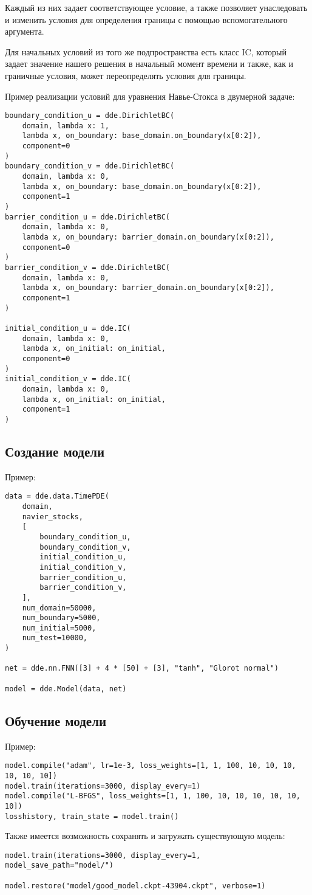 Каждый из них задает соответствующее условие, а также позволяет унаследовать и изменить условия
для определения границы с помощью вспомогательного аргумента.

Для начальных условий из того же подпространства есть класс IC, который задает значение нашего решения в начальный
момент времени и также, как и граничные условия, может переопределять условия для границы.

Пример реализации условий для уравнения Навье-Стокса в двумерной задаче:
\begin{verbatim}
boundary_condition_u = dde.DirichletBC(
    domain, lambda x: 1, 
    lambda x, on_boundary: base_domain.on_boundary(x[0:2]),
    component=0
)
boundary_condition_v = dde.DirichletBC(
    domain, lambda x: 0, 
    lambda x, on_boundary: base_domain.on_boundary(x[0:2]),
    component=1
)
barrier_condition_u = dde.DirichletBC(
    domain, lambda x: 0, 
    lambda x, on_boundary: barrier_domain.on_boundary(x[0:2]),
    component=0
)
barrier_condition_v = dde.DirichletBC(
    domain, lambda x: 0, 
    lambda x, on_boundary: barrier_domain.on_boundary(x[0:2]),
    component=1
)

initial_condition_u = dde.IC(
    domain, lambda x: 0,
    lambda x, on_initial: on_initial,
    component=0
)
initial_condition_v = dde.IC(
    domain, lambda x: 0,
    lambda x, on_initial: on_initial, 
    component=1
)
\end{verbatim}
    
\subsection{Создание модели}
Пример:
\begin{verbatim}
data = dde.data.TimePDE(
    domain,
    navier_stocks,
    [
        boundary_condition_u,
        boundary_condition_v,
        initial_condition_u,
        initial_condition_v,
        barrier_condition_u,
        barrier_condition_v,
    ],
    num_domain=50000,
    num_boundary=5000,
    num_initial=5000,
    num_test=10000,
)

net = dde.nn.FNN([3] + 4 * [50] + [3], "tanh", "Glorot normal")

model = dde.Model(data, net)    
\end{verbatim}
\subsection{Обучение модели}
Пример:
\begin{verbatim}
model.compile("adam", lr=1e-3, loss_weights=[1, 1, 100, 10, 10, 10, 10, 10, 10])
model.train(iterations=3000, display_every=1)
model.compile("L-BFGS", loss_weights=[1, 1, 100, 10, 10, 10, 10, 10, 10])
losshistory, train_state = model.train()
\end{verbatim}
Также имеется возможность сохранять и загружать существующую модель:
\begin{verbatim}
model.train(iterations=3000, display_every=1, model_save_path="model/")

model.restore("model/good_model.ckpt-43904.ckpt", verbose=1)    
\end{verbatim}
